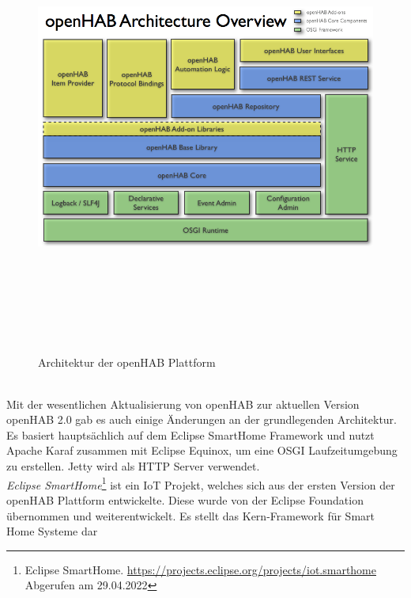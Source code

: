     \begin{figure}[hbt!]
        \centering
        \includegraphics[width=15cm,height=15cm,keepaspectratio]{images/openhab-architecture.png}
        \caption{Architektur der openHAB Plattform \cite{openHAB-architecture2013}}
        \label{fig:architectureopenHAB}
    \end{figure}
    \\
    \pagebreak
    \linebreak
    Mit der wesentlichen Aktualisierung von openHAB zur aktuellen Version openHAB 2.0 gab es auch einige Änderungen an der 
    grundlegenden Architektur. Es basiert hauptsächlich auf dem Eclipse SmartHome Framework und nutzt Apache Karaf zusammen mit 
    Eclipse Equinox, um eine \acs{OSGI} Laufzeitumgebung zu erstellen. Jetty wird als \acs{HTTP} Server verwendet. 
    \\
    \linebreak
    \textit{Eclipse SmartHome}\footnote{Eclipse SmartHome. \url{https://projects.eclipse.org/projects/iot.smarthome} Abgerufen am 29.04.2022} 
    ist ein \acs{IoT} Projekt, welches sich aus der ersten Version der openHAB Plattform entwickelte. 
    Diese wurde von der Eclipse Foundation übernommen und weiterentwickelt. Es stellt das Kern-Framework für Smart Home Systeme dar 
